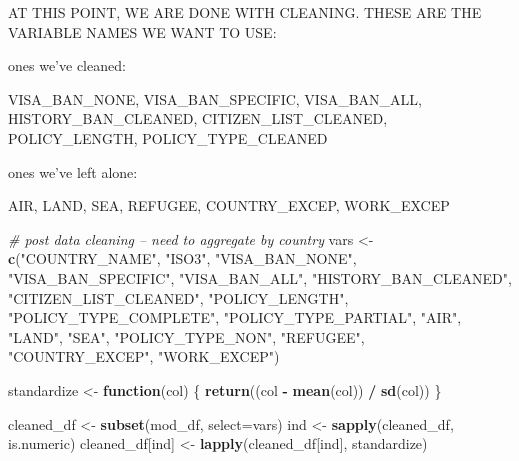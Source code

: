 \documentclass[]{article}
\newenvironment{Shaded}{\begin{snugshade}}{\end{snugshade}}
\newcommand{\CommentTok}[1]{\textcolor[rgb]{0.56,0.35,0.01}{\textit{#1}}}
\newcommand{\ControlFlowTok}[1]{\textcolor[rgb]{0.13,0.29,0.53}{\textbf{#1}}}
\newcommand{\DataTypeTok}[1]{\textcolor[rgb]{0.13,0.29,0.53}{#1}}
\newcommand{\KeywordTok}[1]{\textcolor[rgb]{0.13,0.29,0.53}{\textbf{#1}}}
\newcommand{\NormalTok}[1]{#1}
\newcommand{\OperatorTok}[1]{\textcolor[rgb]{0.81,0.36,0.00}{\textbf{#1}}}
\newcommand{\StringTok}[1]{\textcolor[rgb]{0.31,0.60,0.02}{#1}}
\begin{document}
AT THIS POINT, WE ARE DONE WITH CLEANING. THESE ARE THE VARIABLE NAMES
WE WANT TO USE:

ones we've cleaned:

VISA\_BAN\_NONE, VISA\_BAN\_SPECIFIC, VISA\_BAN\_ALL,
HISTORY\_BAN\_CLEANED, CITIZEN\_LIST\_CLEANED, POLICY\_LENGTH,
POLICY\_TYPE\_CLEANED

ones we've left alone:

AIR, LAND, SEA, REFUGEE, COUNTRY\_EXCEP, WORK\_EXCEP

\begin{Shaded}
\begin{Highlighting}[]
\CommentTok{# post data cleaning -- need to aggregate by country}
\NormalTok{vars <-}\StringTok{ }\KeywordTok{c}\NormalTok{(}\StringTok{"COUNTRY_NAME"}\NormalTok{, }\StringTok{"ISO3"}\NormalTok{, }\StringTok{"VISA_BAN_NONE"}\NormalTok{, }\StringTok{"VISA_BAN_SPECIFIC"}\NormalTok{, }\StringTok{"VISA_BAN_ALL"}\NormalTok{,}
          \StringTok{"HISTORY_BAN_CLEANED"}\NormalTok{, }\StringTok{"CITIZEN_LIST_CLEANED"}\NormalTok{, }\StringTok{"POLICY_LENGTH"}\NormalTok{,}
          \StringTok{"POLICY_TYPE_COMPLETE"}\NormalTok{, }\StringTok{"POLICY_TYPE_PARTIAL"}\NormalTok{, }\StringTok{"AIR"}\NormalTok{, }\StringTok{"LAND"}\NormalTok{, }\StringTok{"SEA"}\NormalTok{, }
          \StringTok{"POLICY_TYPE_NON"}\NormalTok{, }\StringTok{"REFUGEE"}\NormalTok{, }\StringTok{"COUNTRY_EXCEP"}\NormalTok{, }\StringTok{"WORK_EXCEP"}\NormalTok{)}

\NormalTok{standardize <-}\StringTok{ }\ControlFlowTok{function}\NormalTok{(col) \{}
  \KeywordTok{return}\NormalTok{((col }\OperatorTok{-}\StringTok{ }\KeywordTok{mean}\NormalTok{(col)) }\OperatorTok{/}\StringTok{ }\KeywordTok{sd}\NormalTok{(col))}
\NormalTok{\}}

\NormalTok{cleaned_df <-}\StringTok{ }\KeywordTok{subset}\NormalTok{(mod_df, }\DataTypeTok{select=}\NormalTok{vars)}
\NormalTok{ind <-}\StringTok{ }\KeywordTok{sapply}\NormalTok{(cleaned_df, is.numeric)}
\NormalTok{cleaned_df[ind] <-}\StringTok{ }\KeywordTok{lapply}\NormalTok{(cleaned_df[ind], standardize)}
\end{Highlighting}
\end{Shaded}
\end{document}
